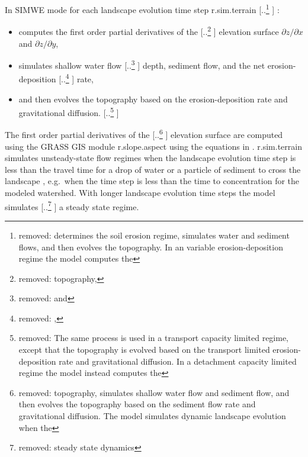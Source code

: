 \documentclass[gmd, manuscript]{copernicus}
\providecommand{\DIFadd}[1]{{\protect\color{blue} \sf #1}} %
\providecommand{\DIFdel}[1]{{\protect\color{red} [..\footnote{removed: #1} ]}} %
\providecommand{\DIFaddbegin}{} %
\providecommand{\DIFaddend}{} %
\providecommand{\DIFdelbegin}{} %
\providecommand{\DIFdelend}{} %
\begin{document}
\DIFdelend %
In SIMWE mode for each \DIFaddbegin \DIFadd{landscape evolution }\DIFaddend time step
r.sim.terrain\DIFdelbegin \DIFdel{determines the soil erosion regime,
simulates water and sediment flows, 
and then evolves the topography. 
In an variable erosion-deposition regime 
the model 
computes the }\DIFdelend \DIFaddbegin \DIFadd{:
} \begin{itemize} 
\item \DIFadd{computes the first order }\DIFaddend partial derivatives of the \DIFdelbegin \DIFdel{topography,
}\DIFdelend \DIFaddbegin \DIFadd{elevation surface
$\partial z / \partial x$ and $\partial z / \partial y$,
}\item \DIFaddend simulates shallow water flow \DIFdelbegin \DIFdel{and }\DIFdelend \DIFaddbegin \DIFadd{depth, sediment flow, and the net }\DIFaddend erosion-deposition \DIFdelbegin \DIFdel{,
}\DIFdelend \DIFaddbegin \DIFadd{rate, 
}\item \DIFaddend and then evolves the topography based on the erosion-deposition rate and gravitational diffusion. 
\DIFdelbegin \DIFdel{The same process is used in
a transport capacity limited regime,
except that the topography is evolved based on 
the transport limited erosion-deposition rate
and gravitational diffusion.
In a detachment capacity limited regime
the model instead
computes the }\DIFdelend \DIFaddbegin  \end{itemize} 
\DIFadd{The first order }\DIFaddend partial derivatives of the \DIFdelbegin \DIFdel{topography,
simulates shallow water flow and sediment flow,
and then evolves the topography based on the sediment flow rate
and gravitational diffusion.
The model simulates dynamic landscape evolution 
when the }\DIFdelend \DIFaddbegin \DIFadd{elevation surface
are computed using the GRASS GIS module r.slope.aspect 
using the equations in \cite{Hofierka2009}.
r.sim.terrain simulates unsteady-state flow regimes
when the landscape evolution }\DIFaddend time step is less than the travel time 
for a drop of water or a particle of sediment to cross the landscape\DIFaddbegin \DIFadd{,
e.g.~when the time step is less than the time to concentration for the modeled watershed}\DIFaddend .
With longer \DIFaddbegin \DIFadd{landscape evolution }\DIFaddend time steps the model simulates \DIFdelbegin \DIFdel{steady state dynamics}\DIFdelend \DIFaddbegin \DIFadd{a steady state regime}\DIFaddend . 
\end{document}
